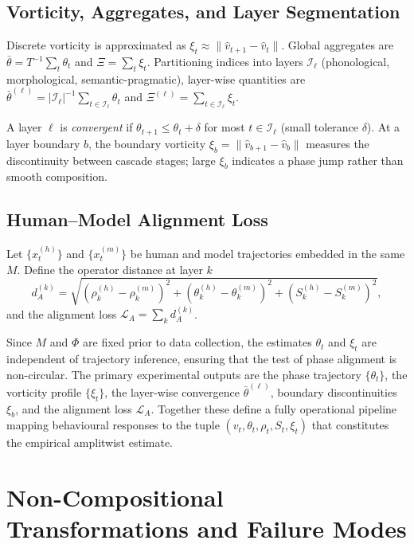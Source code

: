 \documentclass[12pt, a4paper]{article}
\theoremstyle{remark}
\theoremstyle{definition}
\begin{document}
\subsection{Vorticity, Aggregates, and Layer Segmentation}

Discrete vorticity is approximated as $\xi_t \approx \|\hat{v}_{t+1} - \hat{v}_t\|$.
Global aggregates are $\bar\theta = T^{-1}\sum_t \theta_t$ and $\Xi = \sum_t \xi_t$.
Partitioning indices into layers $\mathcal{I}_\ell$ (phonological, morphological,
semantic-pragmatic), layer-wise quantities are $\bar\theta^{(\ell)} =
|\mathcal{I}_\ell|^{-1}\sum_{t\in\mathcal{I}_\ell}\theta_t$ and
$\Xi^{(\ell)} = \sum_{t\in\mathcal{I}_\ell}\xi_t$.

A layer $\ell$ is \emph{convergent} if $\theta_{t+1} \le \theta_t + \delta$ for most
$t \in \mathcal{I}_\ell$ (small tolerance $\delta$).  At a layer boundary $b$, the
boundary vorticity $\xi_b = \|\hat{v}_{b+1} - \hat{v}_b\|$ measures the discontinuity
between cascade stages; large $\xi_b$ indicates a phase jump rather than smooth
composition.

\subsection{Human--Model Alignment Loss}

Let $\{x_t^{(h)}\}$ and $\{x_t^{(m)}\}$ be human and model trajectories embedded in
the same $M$.  Define the operator distance at layer $k$
\[
d_A^{(k)} = \sqrt{
(\rho_k^{(h)} - \rho_k^{(m)})^2
+ (\theta_k^{(h)} - \theta_k^{(m)})^2
+ (S_k^{(h)} - S_k^{(m)})^2
},
\]
and the alignment loss $\mathcal{L}_A = \sum_k d_A^{(k)}$.

Since $M$ and $\Phi$ are fixed prior to data collection, the estimates $\theta_t$ and
$\xi_t$ are independent of trajectory inference, ensuring that the test of phase alignment
is non-circular.  The primary experimental outputs are the phase trajectory $\{\theta_t\}$,
the vorticity profile $\{\xi_t\}$, the layer-wise convergence $\bar\theta^{(\ell)}$,
boundary discontinuities $\xi_b$, and the alignment loss $\mathcal{L}_A$.  Together these
define a fully operational pipeline mapping behavioural responses to the tuple
$(v_t, \theta_t, \rho_t, S_t, \xi_t)$ that constitutes the empirical amplitwist estimate.

\section{Non-Compositional Transformations and Failure Modes}
\label{app:failure}
\end{document}
